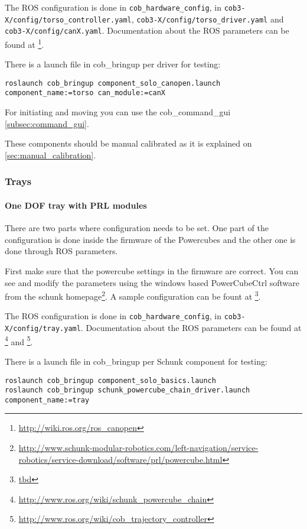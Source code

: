 The ROS configuration is done in \texttt{cob\_hardware\_config}, in \texttt{cob3-X/config/torso\_controller.yaml}, \texttt{cob3-X/config/torso\_driver.yaml} and \texttt{cob3-X/config/canX.yaml}. Documentation about the ROS parameters can be found at \footnote{\url{http://wiki.ros.org/ros_canopen}}.


There is a launch file in cob\_bringup per driver for testing:

\begin{lstlisting}
roslaunch cob_bringup component_solo_canopen.launch component_name:=torso can_module:=canX
\end{lstlisting}

For initiating and moving you can use the cob\_command\_gui \ref{subsec:command_gui}.

These components should be manual calibrated as it is explained on \ref{sec:manual_calibration}.

\subsubsection{Trays}
\paragraph{One DOF tray with PRL modules}

There are two parts where configuration needs to be set. One part of the configuration is done inside the firmware of the Powercubes and the other one is done through ROS parameters.

First make sure that the powercube settings in the firmware are correct. You can see and modify the parameters using the windows based PowerCubeCtrl software from the schunk homepage\footnote{\url{http://www.schunk-modular-robotics.com/left-navigation/service-robotics/service-download/software/prl/powercube.html}}. A sample configuration can be fount at \footnote{\url{tbd}}.

The ROS configuration is done in \texttt{cob\_hardware\_config}, in \texttt{cob3-X/config/tray.yaml}. Documentation about the ROS parameters can be found at \footnote{\url{http://www.ros.org/wiki/schunk_powercube_chain}} and \footnote{\url{http://www.ros.org/wiki/cob_trajectory_controller}}.

There is a launch file in cob\_bringup per Schunk component for testing:

\begin{lstlisting}
roslaunch cob_bringup component_solo_basics.launch
roslaunch cob_bringup schunk_powercube_chain_driver.launch component_name:=tray
\end{lstlisting}

